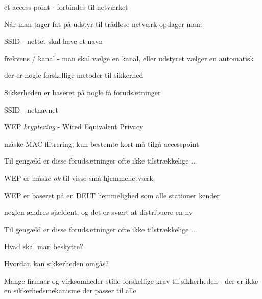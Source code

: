 \documentclass[20pt,landscape,a4paper,footrule]{foils}
\begin{document}
\centerline{\hlkbig et access point - forbindes til netværket}


\begin{list1}
\item Når man tager fat på udstyr til trådløse netværk opdager man:
\item SSID - nettet skal have et navn
\item frekvens / kanal - man skal vælge en kanal, eller udstyret
  vælger en automatisk
\item der er nogle forskellige metoder til sikkerhed
\end{list1}




\begin{list1}
\item Sikkerheden er baseret på nogle få forudsætninger
  \begin{list2}
  \item SSID - netnavnet
  \item WEP \emph{kryptering} - Wired Equivalent Privacy
  \item måske MAC flitrering, kun bestemte kort må tilgå accesspoint
  \end{list2}
\item Til gengæld er disse forudsætninger ofte ikke tilstrækkelige ...
  \begin{list2}
  \item WEP er måske \emph{ok} til visse små hjemmenetværk
  \item WEP er baseret på en DELT hemmelighed som alle stationer kender
  \item nøglen ændres sjældent, og det er svært at distribuere en ny
  \end{list2}

\end{list1}



\begin{list1}
\item Til gengæld er disse forudsætninger ofte ikke tilstrækkelige ...
\item Hvad skal man beskytte?
\item Hvordan kan sikkerheden omgås?
\item Mange firmaer og virksomheder stille forskellige krav til
  sikkerheden - der er ikke en sikkerhedsmekanisme der passer til alle
\end{list1}
\end{document}
